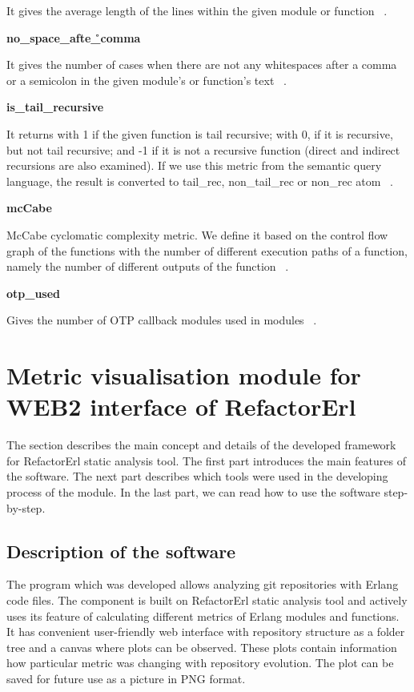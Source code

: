 It gives the average length of the lines within the given module or function ~\cite{refactorerlm}.

\textbf{no\_space\_afte\r\_comma}

It gives the number of cases when there are not any whitespaces after a comma or a semicolon in the given module's or function's text ~\cite{refactorerlm}.

\textbf{is\_tail\_recursive}

It returns with 1 if the given function is tail recursive; with 0, if it is recursive, but not tail recursive; and -1 if it is not a recursive function (direct and indirect recursions are also examined). If we use this metric from the semantic query language, the result is converted to tail\_rec, non\_tail\_rec or non\_rec atom ~\cite{refactorerlm}.

\textbf{mcCabe}

McCabe cyclomatic complexity metric. We define it based on the control flow graph of the functions with the number of different execution paths of a function, namely the number of different outputs of the function ~\cite{refactorerlm}.

\textbf{otp\_used}

Gives the number of OTP callback modules used in modules ~\cite{refactorerlm}.

\section{Metric visualisation module for WEB2 interface of RefactorErl}

The section describes the main concept and details of the developed framework for RefactorErl static analysis tool. The first part introduces the main features of the software. The next part describes which tools were used in the developing process of the module. In the last part, we can read how to use the software step-by-step.

\subsection{Description of the software}

The program which was developed allows analyzing git repositories with Erlang code files. The component is built on RefactorErl static analysis tool and actively uses its feature of calculating different metrics of Erlang modules and functions. It has convenient user-friendly web interface with repository structure as a folder tree and a canvas where plots can be observed. These plots contain information how particular metric was changing with repository evolution. The plot can be saved for future use as a picture in PNG format.

